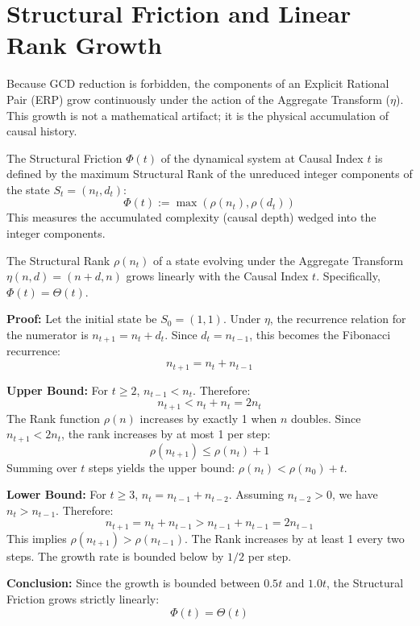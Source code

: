 \documentclass[11pt, letterpaper]{article}
\newcommand{\aop}{\eta}
\newcommand{\rank}{\rho}
\begin{document}
\section{Structural Friction and Linear Rank Growth}

Because GCD reduction is forbidden, the components of an Explicit Rational Pair (ERP) grow continuously under the action of the Aggregate Transform ($\aop$). This growth is not a mathematical artifact; it is the physical accumulation of causal history.

\begin{definition}\label{def:friction}
\begin{rsbox}
The Structural Friction $\Phi(t)$ of the dynamical system at Causal Index $t$ is defined by the maximum Structural Rank of the unreduced integer components of the state $S_t = (n_t, d_t)$:
\[ \Phi(t) := \max(\rank(n_t), \rank(d_t)) \]
This measures the accumulated complexity (causal depth) wedged into the integer components.
\end{rsbox}
\end{definition}

\begin{theorem}[Linear Rank Growth under $\aop$]\label{thm:linear_growth}
\begin{rsbox}
The Structural Rank $\rank(n_t)$ of a state evolving under the Aggregate Transform $\aop(n,d) = (n+d, n)$ grows linearly with the Causal Index $t$. Specifically, $\Phi(t) = \Theta(t)$.

\textbf{Proof:}
Let the initial state be $S_0 = (1, 1)$.
Under $\aop$, the recurrence relation for the numerator is $n_{t+1} = n_t + d_t$.
Since $d_t = n_{t-1}$, this becomes the Fibonacci recurrence:
\[ n_{t+1} = n_t + n_{t-1} \]

\textbf{Upper Bound:}
For $t \ge 2$, $n_{t-1} < n_t$. Therefore:
\[ n_{t+1} < n_t + n_t = 2n_t \]
The Rank function $\rank(n)$ increases by exactly 1 when $n$ doubles. Since $n_{t+1} < 2n_t$, the rank increases by at most 1 per step:
\[ \rank(n_{t+1}) \le \rank(n_t) + 1 \]
Summing over $t$ steps yields the upper bound: $\rank(n_t) < \rank(n_0) + t$.

\textbf{Lower Bound:}
For $t \ge 3$, $n_t = n_{t-1} + n_{t-2}$. Assuming $n_{t-2} > 0$, we have $n_t > n_{t-1}$.
Therefore:
\[ n_{t+1} = n_t + n_{t-1} > n_{t-1} + n_{t-1} = 2n_{t-1} \]
This implies $\rank(n_{t+1}) > \rank(n_{t-1})$. The Rank increases by at least 1 every two steps.
The growth rate is bounded below by $1/2$ per step.

\textbf{Conclusion:}
Since the growth is bounded between $0.5t$ and $1.0t$, the Structural Friction grows strictly linearly:
\[ \Phi(t) = \Theta(t) \]
\end{rsbox}
\end{theorem}
\end{document}
